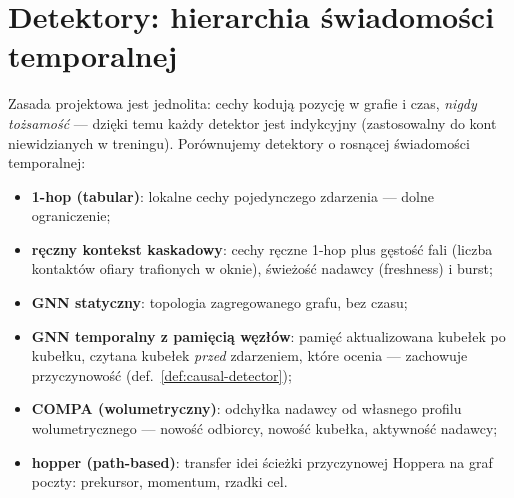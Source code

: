 \section{Detektory: hierarchia świadomości temporalnej}
\label{sec:k-detektory}

Zasada projektowa jest jednolita: cechy kodują pozycję w grafie
i czas, \emph{nigdy tożsamość} --- dzięki temu każdy detektor jest
indykcyjny (zastosowalny do kont niewidzianych w treningu). Porównujemy
detektory o rosnącej świadomości temporalnej:

\begin{itemize}
\item \textbf{1-hop (tabular)}: lokalne cechy pojedynczego zdarzenia ---
dolne ograniczenie;
\item \textbf{ręczny kontekst kaskadowy}: cechy ręczne 1-hop plus
gęstość fali (liczba kontaktów ofiary trafionych w oknie),
świeżość nadawcy (freshness) i burst;
\item \textbf{GNN statyczny}: topologia zagregowanego grafu, bez czasu;
\item \textbf{GNN temporalny z pamięcią węzłów}: pamięć aktualizowana
kubełek po kubełku, czytana kubełek \emph{przed} zdarzeniem, które
ocenia --- zachowuje przyczynowość (def.~\ref{def:causal-detector});
\item \textbf{COMPA (wolumetryczny)}: odchyłka nadawcy od własnego
profilu wolumetrycznego --- nowość odbiorcy, nowość kubełka,
aktywność nadawcy;
\item \textbf{hopper (path-based)}: transfer idei ścieżki przyczynowej
Hoppera \citep{ho2021hopper} na graf poczty: prekursor, momentum,
rzadki cel.
\end{itemize}

